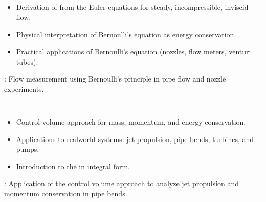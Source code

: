 \documentclass[letterpaper,10pt,english]{jupyterBook}
\begin{document}
\subsection{}
\label{\detokenize{syllabus:weeks-9-10-bernoullis-equation-and-energy-conservation}}\begin{itemize}
\item {} 
\sphinxAtStartPar
Derivation of  from the Euler equations for steady, incompressible, inviscid flow.

\item {} 
\sphinxAtStartPar
Physical interpretation of Bernoulli’s equation as energy conservation.

\item {} 
\sphinxAtStartPar
Practical applications of Bernoulli’s equation (nozzles, flow meters, venturi tubes).

\end{itemize}

\sphinxAtStartPar
{}: Flow measurement using Bernoulli’s principle in pipe flow and nozzle experiments.


\bigskip\hrule\bigskip



\subsection{}
\label{\detokenize{syllabus:weeks-11-12-control-volume-analysis-and-integral-conservation-laws}}\begin{itemize}
\item {} 
\sphinxAtStartPar
Control volume approach for mass, momentum, and energy conservation.

\item {} 
\sphinxAtStartPar
Applications to real\sphinxhyphen{}world systems: jet propulsion, pipe bends, turbines, and pumps.

\item {} 
\sphinxAtStartPar
Introduction to the  in integral form.

\end{itemize}

\sphinxAtStartPar
{}: Application of the control volume approach to analyze jet propulsion and momentum conservation in pipe bends.
\end{document}
